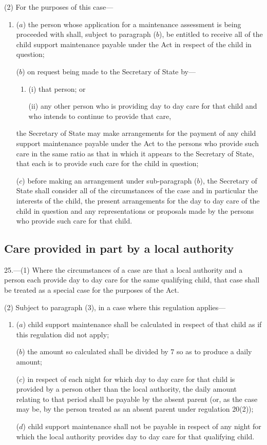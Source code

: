\documentclass[a4paper]{article}
\begin{document}
(2) For the purposes of this case—
\begin{enumerate}\item[]
($a$) the person whose application for a maintenance assessment is being proceeded with shall, subject to paragraph ($b$), be entitled to receive all of the child support maintenance payable under the Act in respect of the child in question;

($b$) on request being made to the Secretary of State by—
\begin{enumerate}\item[]
(i) that person; or

(ii) any other person who is providing day to day care for that child and who intends to continue to provide that care,
\end{enumerate}
the Secretary of State may make arrangements for the payment of any child support maintenance payable under the Act to the persons who provide such care in the same ratio as that in which it appears to the Secretary of State, that each is to provide such care for the child in question;

($c$) before making an arrangement under sub-paragraph ($b$), the Secretary of State shall consider all of the circumstances of the case and in particular the interests of the child, the present arrangements for the day to day care of the child in question and any representations or proposals made by the persons who provide such care for that child.
\end{enumerate}

\subsection[25. Care provided in part by a local authority]{Care provided in part by a local authority}

25.—(1) Where the circumstances of a case are that a local authority and a person each provide day to day care for the same qualifying child, that case shall be treated as a special case for the purposes of the Act.

(2) 
Subject to paragraph (3), in a case where this regulation applies---  %
\begin{enumerate}\item[]
($a$) child support maintenance shall be calculated in respect of that child as if this regulation did not apply;

($b$) the amount so calculated shall be divided by 7 so as to produce a daily amount;

($c$) in respect of each night for which day to day care for that child is provided by a person other than the local authority, the daily amount relating to that period shall be payable by the absent parent (or, as the case may be, by the person treated as an absent parent under regulation 20(2));

($d$) child support maintenance shall not be payable in respect of any night for which the local authority provides day to day care for that qualifying child.
\end{enumerate}
\end{document}
